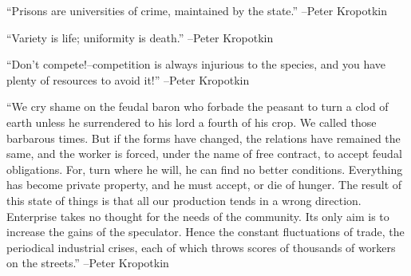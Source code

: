 \documentclass{article}%
\begin{document}
\linebreak%
\vspace{1mm}%
\begin{minipage}{\textwidth}%
\flushleft%
“Prisons are universities of crime, maintained by the state.”%
\linebreak%
\vspace{1mm}%
–Peter Kropotkin%
\linebreak%
\vspace{1mm}%
\end{minipage}%
\linebreak%
\vspace{1mm}%
\begin{minipage}{\textwidth}%
\flushleft%
“Variety is life; uniformity is death.”%
\linebreak%
\vspace{1mm}%
–Peter Kropotkin%
\linebreak%
\vspace{1mm}%
\end{minipage}%
\linebreak%
\vspace{1mm}%
\begin{minipage}{\textwidth}%
\flushleft%
“Don't compete!–competition is always injurious to the species, and you have plenty of resources to avoid it!”%
\linebreak%
\vspace{1mm}%
–Peter Kropotkin%
\linebreak%
\vspace{1mm}%
\end{minipage}%
\linebreak%
\vspace{1mm}%
\begin{minipage}{\textwidth}%
\flushleft%
“We cry shame on the feudal baron who forbade the peasant to turn a clod of earth unless he surrendered to his lord a fourth of his crop. We called those barbarous times. But if the forms have changed, the relations have remained the same, and the worker is forced, under the name of free contract, to accept feudal obligations. For, turn where he will, he can find no better conditions. Everything has become private property, and he must accept, or die of hunger. The result of this state of things is that all our production tends in a wrong direction. Enterprise takes no thought for the needs of the community. Its only aim is to increase the gains of the speculator. Hence the constant fluctuations of trade, the periodical industrial crises, each of which throws scores of thousands of workers on the streets.”%
\linebreak%
\vspace{1mm}%
–Peter Kropotkin%
\linebreak%
\vspace{1mm}%
\end{minipage}%
\end{document}
